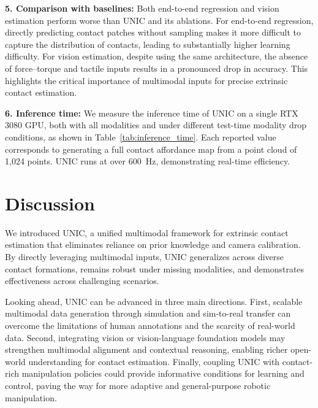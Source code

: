 \documentclass[letterpaper, 10 pt, conference]{ieeeconf}  %
\newcommand{\unic}{\textsc{UNIC}}
\begin{document}
\textbf{5. Comparison with baselines:} Both end-to-end regression and vision estimation perform worse than \unic{} and its ablations. For end-to-end regression, directly predicting contact patches without sampling makes it more difficult to capture the distribution of contacts, leading to substantially higher learning difficulty. For vision estimation, despite using the same architecture, the absence of force–torque and tactile inputs results in a pronounced drop in accuracy. This highlights the critical importance of multimodal inputs for precise extrinsic contact estimation.

\textbf{6. Inference time:} 
We measure the inference time of \unic{} on a single RTX 3080 GPU, both with all modalities and under different test-time modality drop conditions, as shown in Table~\ref{tab:inference_time}. Each reported value corresponds to generating a full contact affordance map from a point cloud of 1,024 points. \unic{} runs at over \SI{600}{\hertz}, demonstrating real-time efficiency.


\section{Discussion}

We introduced \unic{}, a unified multimodal framework for extrinsic contact estimation that eliminates reliance on prior knowledge and camera calibration. By directly leveraging multimodal inputs, \unic{} generalizes across diverse contact formations, remains robust under missing modalities, and demonstrates effectiveness across challenging scenarios.

Looking ahead, \unic{} can be advanced in three main directions. First, scalable multimodal data generation through simulation and sim-to-real transfer can overcome the limitations of human annotations and the scarcity of real-world data. Second, integrating vision \cite{simeoni2025dinov3} or vision-language foundation models \cite{yang2025qwen3} may strengthen multimodal alignment and contextual reasoning, enabling richer open-world understanding for contact estimation. Finally, coupling \unic{} with contact-rich manipulation policies \cite{higuera2023perceiving} could provide informative conditions for learning and control, paving the way for more adaptive and general-purpose robotic manipulation.





\end{document}
